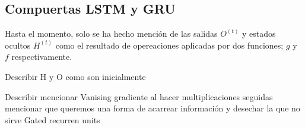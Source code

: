 \subsection{Compuertas LSTM y GRU}

Hasta el momento, solo se ha hecho mención de las salidas $O^{(t)}$ y estados ocultos $H^{(t)}$ como
el resultado de opereaciones aplicadas por dos funciones; $g$ y $f$ respectivamente.

Describir H y O como son inicialmente

Describir mencionar Vanising gradiente al hacer multiplicaciones seguidas
mencionar que queremos una forma de acarrear información y desechar la que no sirve
Gated recurren units
